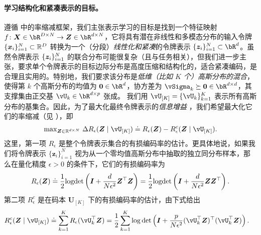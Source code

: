 \documentclass[../../book-main_zh.tex]{subfiles}
\begin{document}
\paragraph{学习结构化和紧凑表示的目标。}
遵循  中的率缩减框架，我们主张表示学习的目标是找到一个特征映射 \(f \colon \X \in \bR^{D \times N} \to \Z\in \bR^{d \times N}\)，它将具有潜在非线性和多模态分布的输入令牌 \(\{\bm x_i\}_{i=1}^N \subset \mathbb{R}^D\) 转换为一个（分段）\textit{线性化和紧凑}的令牌表示 \(\{\bm z_i\}_{i=1}^N \subset \bR^{d}\)。虽然令牌表示 \(\{\bm{z}_{i}\}_{i = 1}^{N}\) 的联合分布可能很复杂（且与任务相关），但我们进一步主张，要求单个令牌表示的目标边际分布是高度压缩和结构化的，适合紧凑编码，是合理且实用的。特别地，我们要求该分布是\textit{低维（比如 \(K\) 个）高斯分布的混合}，使得第 \(k\) 个高斯分布的均值为 \(\Zero \in \bR^{d}\)，协方差为 \(\vSigma_{k} \succeq \Zero \in \bR^{d \times d}\)，其支撑集由正交基 \(\vU_{k} \in \bR^{d \times p}\) 张成。
我们用 $\vU_{[K]} = \{\vU_k\}_{k=1}^K$ 表示所有高斯分布的基集合。因此，为了最大化最终令牌表示的\textit{信息增益} \cite{ma2022principles}，我们希望最大化它们的率缩减（见 ），即
\begin{align}\label{eq:rate reduction}
    \mathrm{max}_{\bm Z \in \R^{d\times N}}\ \Delta R_{\epsilon}(\Z \mid \vU_{[K]}) \doteq R_{\epsilon}(\Z) - R^c_{\epsilon}(\Z \mid \vU_{[K]}).
\end{align}
这里，第一项 $R_{\epsilon}$ 是整个令牌表示集合的有损编码率的估计。更具体地说，如果我们将令牌表示 $\{\bm z_i\}_{i=1}^N$ 视为从一个零均值高斯分布中抽取的独立同分布样本，那么在量化精度 $\epsilon > 0$ 的条件下，它们的有损编码率为
\begin{equation}\label{eq:coding_rate}
    R_{\epsilon}(\bm{Z}) \doteq \frac{1}{2}\textrm{logdet}\left(\bm{I} + \frac{d}{N\epsilon^{2}}\bm{Z}^{\top}\bm{Z}\right) = \frac{1}{2}\textrm{logdet}\left(\bm{I} + \frac{d}{N\epsilon^{2}}\bm{Z}\bm{Z}^{\top}\right).
\end{equation}
第二项 $R_{\epsilon}^c$ 是在码本 $\bm U_{[K]}$ 下的有损编码率的估计，由下式给出
\begin{equation}
\begin{aligned}
    R_{\epsilon}^c(\Z \mid \vU_{[K]}) &\doteq \sum_{k=1}^{K}R_{\epsilon}(\vU_k^{\top} \Z) = \frac{1}{2}\sum_{k=1}^{K}\log\det\left(\I +
    \frac{p}{N\epsilon^{2}}(\vU_k^{\top}\Z)^{\top}(\vU_k^{\top}\Z)\right).
\end{aligned}
\label{eq:def-mcr-Rc}
\end{equation}
\end{document}
